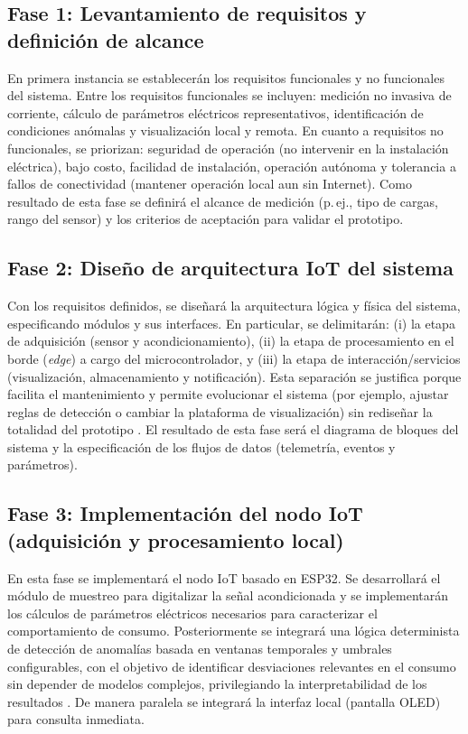 ﻿\documentclass[12pt,openright,oneside]{report}
\theoremstyle{mytheoremstyle}
\theoremstyle{mytheoremstyle}
\theoremstyle{myproblemstyle}
\begin{document}
\subsection{Fase 1: Levantamiento de requisitos y definición de alcance}
\label{subsubsec:met_req}

En primera instancia se establecerán los requisitos funcionales y no funcionales del sistema. Entre los requisitos funcionales se incluyen: medición no invasiva de corriente, cálculo de parámetros eléctricos representativos, identificación de condiciones anómalas y visualización local y remota. En cuanto a requisitos no funcionales, se priorizan: seguridad de operación (no intervenir en la instalación eléctrica), bajo costo, facilidad de instalación, operación autónoma y tolerancia a fallos de conectividad (mantener operación local aun sin Internet). Como resultado de esta fase se definirá el alcance de medición (p.\,ej., tipo de cargas, rango del sensor) y los criterios de aceptación para validar el prototipo.

\subsection{Fase 2: Diseño de arquitectura IoT del sistema}
\label{subsubsec:met_arq}

Con los requisitos definidos, se diseñará la arquitectura lógica y física del sistema, especificando módulos y sus interfaces. En particular, se delimitarán: (i) la etapa de adquisición (sensor y acondicionamiento), (ii) la etapa de procesamiento en el borde (\textit{edge}) a cargo del microcontrolador, y (iii) la etapa de interacción/servicios (visualización, almacenamiento y notificación). Esta separación se justifica porque facilita el mantenimiento y permite evolucionar el sistema (por ejemplo, ajustar reglas de detección o cambiar la plataforma de visualización) sin rediseñar la totalidad del prototipo \cite{nist-sp800-183,iota-arm-2013}. El resultado de esta fase será el diagrama de bloques del sistema y la especificación de los flujos de datos (telemetría, eventos y parámetros).

\subsection{Fase 3: Implementación del nodo IoT (adquisición y procesamiento local)}
\label{subsubsec:met_nodo}

En esta fase se implementará el nodo IoT basado en ESP32. Se desarrollará el módulo de muestreo para digitalizar la señal acondicionada y se implementarán los cálculos de parámetros eléctricos necesarios para caracterizar el comportamiento de consumo. Posteriormente se integrará una lógica determinista de detección de anomalías basada en ventanas temporales y umbrales configurables, con el objetivo de identificar desviaciones relevantes en el consumo sin depender de modelos complejos, privilegiando la interpretabilidad de los resultados \cite{chandola2009anomaly}. De manera paralela se integrará la interfaz local (pantalla OLED) para consulta inmediata.
\end{document}

